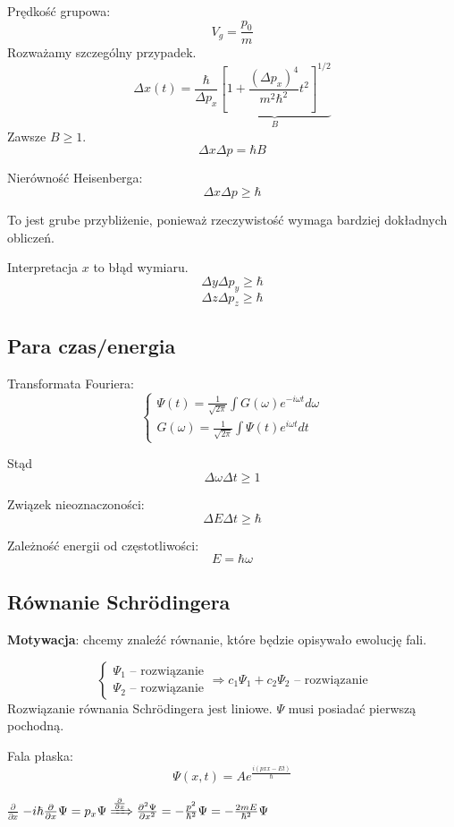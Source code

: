 Prędkość grupowa:
\[
V_g = \frac{p_0}{m}
\]
Rozważamy szczególny przypadek.
\[
\Delta x (t) = \frac{\hbar}{\Delta p_x} \underbrace{\left[1 + \frac{(\Delta p_x)^4}{m^2\hbar^2}t^2\right]^{1/2}}_{B}
\]
Zawsze $B \geq 1$.
\[
\Delta x \Delta p = \hbar B
\]

Nierówność Heisenberga:
\[
\Delta x \Delta p \geq \hbar
\]

To jest grube przybliżenie, ponieważ rzeczywistość wymaga bardziej dokładnych obliczeń.

Interpretacja $x$ to błąd wymiaru.
\[
\Delta y \Delta p_y \geq \hbar
\]
\[
\Delta z \Delta p_z \geq \hbar
\]

\subsection{Para czas/energia}
Transformata Fouriera:
\[
\begin{cases}
\Psi(t) = \frac{1}{\sqrt{2\pi}} \int G(\omega) e^{-i\omega t} d\omega\\
G(\omega) = \frac{1}{\sqrt{2\pi}} \int \Psi(t) e^{i\omega t} dt
\end{cases}
\]

Stąd
\[
\Delta \omega \Delta t \geq 1
\]

Związek nieoznaczoności:
\[
\Delta E \Delta t \geq \hbar
\]

Zależność energii od częstotliwości:
\[
E = \hbar \omega
\]

\subsection{Równanie Schrödingera}

\textbf{Motywacja}: chcemy znaleźć równanie, które będzie opisywało ewolucję fali.

\[
\begin{cases}
    \Psi_1 \text{ -- rozwiązanie} \\
    \Psi_2 \text{ -- rozwiązanie}
\end{cases} \Rightarrow c_1 \Psi_1 + c_2 \Psi_2 \text{ -- rozwiązanie}
\]
Rozwiązanie równania Schrödingera jest liniowe. $\Psi$ musi posiadać pierwszą pochodną.

Fala płaska:
\[
\Psi(x,t) = A e^{\frac{i(px x - Et)}{\hbar}}
\]

$\frac{\partial}{\partial x}$ $-i \hbar \frac{\partial}{\partial x} \Psi = p_x \Psi \xRightarrow{\frac{\partial}{\partial x}} \frac{\partial^2\Psi}{\partial x^2} = -\frac{p^2}{\hbar^2} \Psi = -\frac{2mE}{\hbar^2} \Psi$

